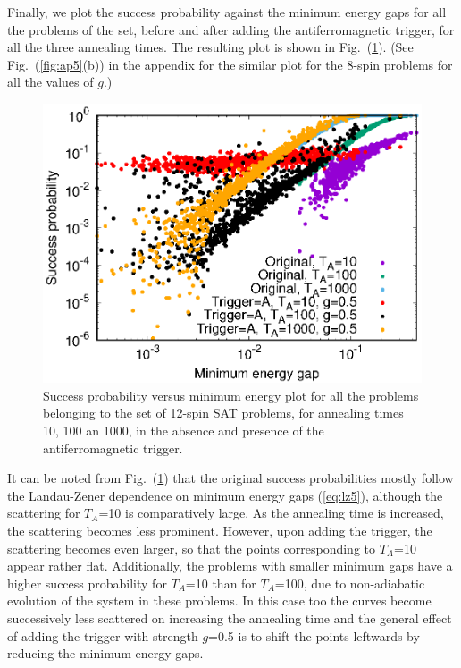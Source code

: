 \documentclass[../main.tex]{subfiles}
\begin{document}
Finally, we plot the success probability against the minimum energy gaps for all the problems of the set, before and after adding the antiferromagnetic trigger, for all the three annealing times. The resulting plot is shown in Fig.~(\ref{fig:a17}). (See Fig.~(\ref{fig:ap5}(b)) in the appendix for the similar plot for the 8-spin problems for all the values of $g$.)

\begin{figure}
\centering 
\includegraphics[scale=0.8]{SuccVsGap_OA_g0.eps}
\caption{Success probability versus minimum energy plot for all the problems belonging to the set of 12-spin SAT problems, for annealing times 10, 100 an 1000, in the absence and presence of the  antiferromagnetic trigger.}
\label{fig:a17}
\end{figure}


It can be noted from Fig.~(\ref{fig:a17}) that the original success probabilities mostly follow the Landau-Zener dependence on minimum energy gaps (\ref{eq:lz5}), although the scattering for $T_A$=10 is comparatively large. As the annealing time is increased, the scattering becomes less prominent. However, upon adding the trigger, the scattering becomes even larger, so that the points corresponding to $T_A$=10 appear rather flat. Additionally, the problems with smaller minimum gaps have a higher success probability for $T_A$=10 than for $T_A$=100, due to non-adiabatic evolution of the system in these problems. In this case too the curves become successively less scattered on increasing the annealing time and the general effect of adding the trigger with strength $g$=0.5 is to shift the points leftwards by reducing the minimum energy gaps.
\newpage
\end{document}
